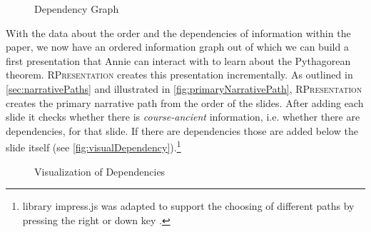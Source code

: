 \documentclass{llncs}
\newcommand{\sys}{\textsc{RPresentation}\xspace}
\begin{document}
\begin{figure}
\vspace{-30pt}
  \begin{center}
\vspace{-20pt}
  \caption{Dependency Graph}
  \label{fig:depGraphPythagoreanFull}
\vspace{0pt}
  \end{center}
\end{figure}

\begin{figure}
\vspace{-60pt}
\end{figure}

With the data about the order and the dependencies of information within the paper, we now have an ordered information graph out of which we can build a first presentation that Annie can interact with to learn about the Pythagorean theorem. \sys creates this presentation incrementally. As outlined in \autoref{sec:narrativePaths} and illustrated in \autoref{fig:primaryNarrativePath}, \sys creates the primary narrative path from the order of the slides. After adding each slide it checks whether there is \textit{course-ancient} information, i.e. whether there are dependencies, for that slide. If there are dependencies those are added below the slide itself (see \autoref{fig:visualDependency}).\footnote{library impress.js was adapted to support the choosing of different paths by pressing the right or down key \cite{npentrel:npentrel15}.}

\begin{figure}
\vspace{-16pt}
  \begin{center}
\vspace{-7pt}
  \caption{Visualization of Dependencies}
  \label{fig:visualDependency}
\vspace{-15pt}
  \end{center}
\end{figure}
\end{document}
